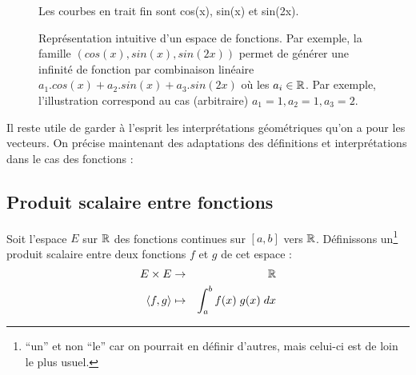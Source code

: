 \begin{figure}[H]
\begin{center}
\end{center}
\caption{Représentation intuitive d'un espace de fonctions. Par exemple, la famille $(cos(x),sin(x),sin(2x))$ permet de générer une infinité de fonction par combinaison linéaire $a_1.cos(x)+a_2.sin(x)+a_3.sin(2x)$ où les $a_i \in \mathbb{R}$. Par exemple, l'illustration correspond au cas (arbitraire) $a_1=1,a_2=1,a_3=2$.} Les courbes en trait fin sont cos(x), sin(x) et sin(2x).
\label{fonctions_orthogonales}
\end{figure}

Il reste utile de garder à l'esprit les interprétations géométriques qu'on a pour les vecteurs. On précise maintenant des adaptations des définitions et interprétations dans le cas des fonctions :

\subsection{Produit scalaire entre fonctions}
\label{sec:prodscal}

Soit l'espace $E$ sur $\mathbb{R}$ des fonctions continues sur
$[a,b]$ vers $\mathbb{R}$. Définissons un\footnote{``un'' et non ``le'' car
on pourrait en définir d'autres, mais celui-ci est de loin le plus usuel.} produit scalaire entre deux fonctions $f$ et $g$ de cet espace :
\begin{eqnarray}
E \times E & \rightarrow & \mathbb{R} \nonumber \\
\langle f, g \rangle & \mapsto & \int_a^b f(x)\; g(x)\; dx
\end{eqnarray}

